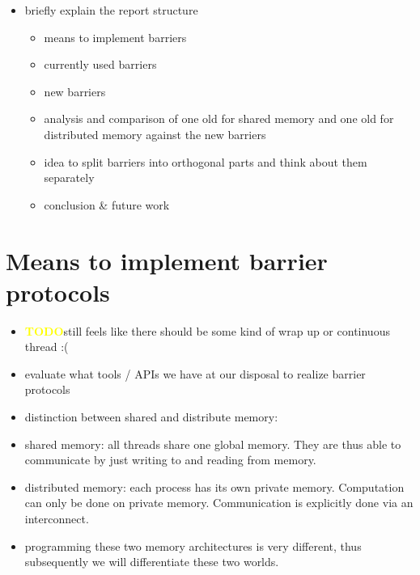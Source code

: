 \documentclass[a4paper, 10pt]{article}
\def \todo{\textbf{\textcolor{yellow}{TODO}}}
\begin{document}
\begin{itemize}
	\item briefly explain the report structure
		\begin{itemize}
			\item means to implement barriers
			\item currently used barriers
			\item new barriers
			\item analysis and comparison of one old for shared memory and one old for distributed memory against the new barriers
			\item idea to split barriers into orthogonal parts and think about them separately
			\item conclusion \& future work
		\end{itemize}
\end{itemize}


\section{Means to implement barrier protocols}
\begin{itemize}
	\item \todo still feels like there should be some kind of wrap up or continuous thread :(
	\item evaluate what tools / APIs we have at our disposal to realize barrier protocols
	\item distinction between shared and distribute memory:
	\item shared memory: all threads share one global memory. They are thus able to communicate by just writing to and reading from memory.
	\item distributed memory: each process has its own private memory. Computation can only be done on private memory. Communication is explicitly done via an interconnect.
	\item programming these two memory architectures is very different, thus subsequently we will differentiate these two worlds.
\end{itemize}

\end{document}
